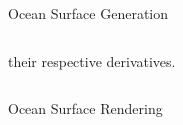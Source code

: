 \documentclass[final,hyperref={pdfpagelabels=true}]{beamer}
\begin{document}
\begin{frame}[fragile]
\begin{center}
\begin{minipage}{\textwidth}
\begin{block}{Ocean Surface Generation}
\begin{columns}[t]
\begin{column}{0.45\linewidth}
					their respective derivatives.
					\begin{figure}
					 \centering
					 \hfill
					 \hfill
					\end{figure}
				\end{column}	  
			\end{columns}
		\end{block}
	\end{minipage}
	\begin{minipage}{\textwidth}
		\begin{block}{Ocean Surface Rendering}
			\begin{columns}[t]
				\begin{column}{0.95\linewidth}
					\begin{figure}
					\centering

\end{figure}
\end{column}
\end{columns}
\end{block}
\end{minipage}
\end{center}
\end{frame}
\end{document}
